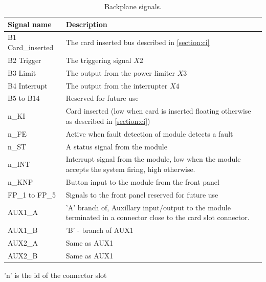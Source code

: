 \begin{table}[h!]
    \centering
    \begin{tabular}{|p{}|p{}|}
        \hline
        Signal name & Description \\ \hline
        B1 Card\_inserted & The card inserted bus described in \cref{section:ci} \\ \hline
        B2 Trigger & The triggering signal $X2$ \\ \hline
        B3 Limit & The output from the power limiter $X3$ \\ \hline
        B4 Interrupt & The output from the interrupter $X4$ \\ \hline
        B5 to B14 & Reserved for future use \\ \hline
        n\_KI & Card inserted (low when card is inserted floating otherwise as described in \cref{section:ci}) \\ \hline
        n\_FE & Active when fault detection of module detects a fault \\ \hline
        n\_ST & A status signal from the module \\ \hline
        n\_INT & Interrupt signal from the module, low when the module accepts the system firing, high otherwise. \\ \hline
        n\_KNP & Button input to the module from the front panel\\ \hline
        FP\_1 to FP\_5 & Signals to the front panel reserved for future use\\ \hline
        AUX1\_A & 'A' branch of, Auxillary input/output to the module terminated in a connector close to the card slot connector.\\ \hline
        AUX1\_B & 'B' - branch of AUX1\\ \hline
        AUX2\_A & Same as AUX1\\ \hline
        AUX2\_B & Same as AUX1 \\ \hline
    \end{tabular}
    \caption{Backplane signals.}
    'n' is the id of the connector slot
    \label{tab:bus}
\end{table}

